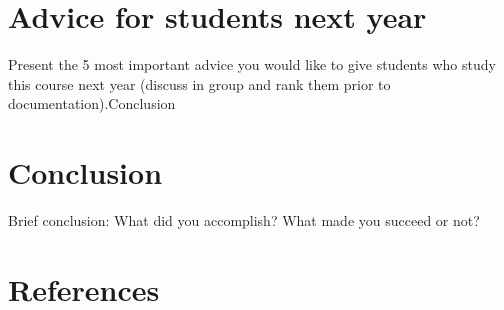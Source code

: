 \documentclass[12pt]{article}
\begin{document}
\section{Advice for students next year}
Present the 5 most important advice you would like to give students who study this course next year (discuss in group and rank them prior to documentation).Conclusion

\section{Conclusion}
Brief conclusion: What did you accomplish? What made you succeed or not? 

\section{References}






\end{document}
